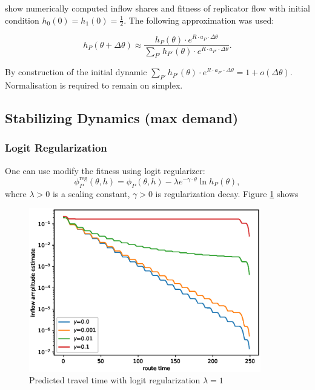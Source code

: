\documentclass[12pt]{article}
\begin{document}
 show numerically computed inflow shares and fitness of replicator flow with initial condition $h_0(0) = h_1(0) = \frac{1}{2}$. The following approximation was used:

$$ h_P(\theta + \Delta\theta) \approx \frac{ h_P(\theta) \cdot e^{ R \cdot a_P \cdot \Delta \theta }} { \sum_{P'}  h_{P'}(\theta) \cdot e^{ R \cdot a_{P'} \cdot \Delta\theta } } .$$

By construction of the initial dynamic $\sum_{P'}  h_{P'}(\theta) \cdot e^{ R \cdot a_{P'} \cdot \Delta\theta } = 1 + o(\Delta \theta)$. Normalisation is required to remain on simplex.

\newpage

\subsection*{Stabilizing Dynamics (max demand)}

\subsubsection*{Logit Regularization}

One can use modify the fitness using logit regularizer:
$$ \phi^{\text{reg}}_P(\theta, h) = \phi_P(\theta, h) - \lambda e^{-\gamma \cdot \theta} \ln{ h_P(\theta) }, $$
where $\lambda > 0$ is a scaling constant, $\gamma > 0$ is regularization decay. Figure \ref{fig:reg_pred_tt} shows

\begin{figure}
	\includegraphics[width=0.9\textwidth]{img/reg_pred_tt.eps}
	\caption{Predicted travel time with logit regularization $\lambda=1$}
	\label{fig:reg_pred_tt}

\end{figure}
\end{document}
